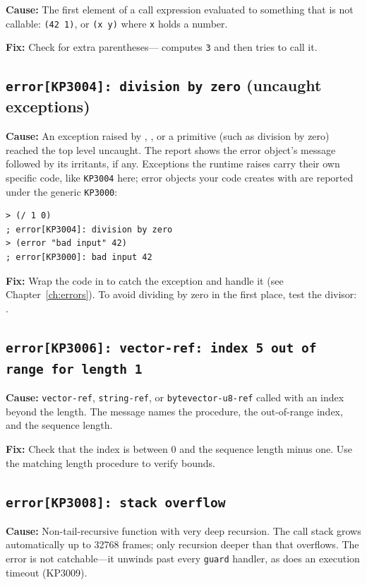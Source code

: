\textbf{Cause:} The first element of a call expression evaluated to something that is not callable: \texttt{(42 1)}, or \texttt{(x y)} where \texttt{x} holds a number.

\textbf{Fix:} Check for extra parentheses--- computes \texttt{3} and then tries to call it.

\subsection{\texttt{error[KP3004]: division by zero} (uncaught exceptions)}

\textbf{Cause:} An exception raised by , , or a primitive (such as division by zero) reached the top level uncaught. The report shows the error object's message followed by its irritants, if any. Exceptions the runtime raises carry their own specific code, like \texttt{KP3004} here; error objects your code creates with  are reported under the generic \texttt{KP3000}:

\begin{lstlisting}[style=repl]
> (/ 1 0)
; error[KP3004]: division by zero
> (error "bad input" 42)
; error[KP3000]: bad input 42
\end{lstlisting}

\textbf{Fix:} Wrap the code in  to catch the exception and handle it (see Chapter~\ref{ch:errors}). To avoid dividing by zero in the first place, test the divisor: .

\subsection{\texttt{error[KP3006]: vector-ref: index 5 out of range for length 1}}

\textbf{Cause:} \texttt{vector-ref}, \texttt{string-ref},
or \texttt{bytevector-u8-ref} called with an index beyond
the length. The message names the procedure, the
out-of-range index, and the sequence length.

\textbf{Fix:} Check that the index is between 0 and
the sequence length minus one. Use the matching
length procedure to verify bounds.

\subsection{\texttt{error[KP3008]: stack overflow}}

\textbf{Cause:} Non-tail-recursive function with very deep recursion. The call stack grows automatically up to 32768 frames; only recursion deeper than that overflows. The error is not catchable---it unwinds past every \texttt{guard} handler, as does an execution timeout (KP3009).


